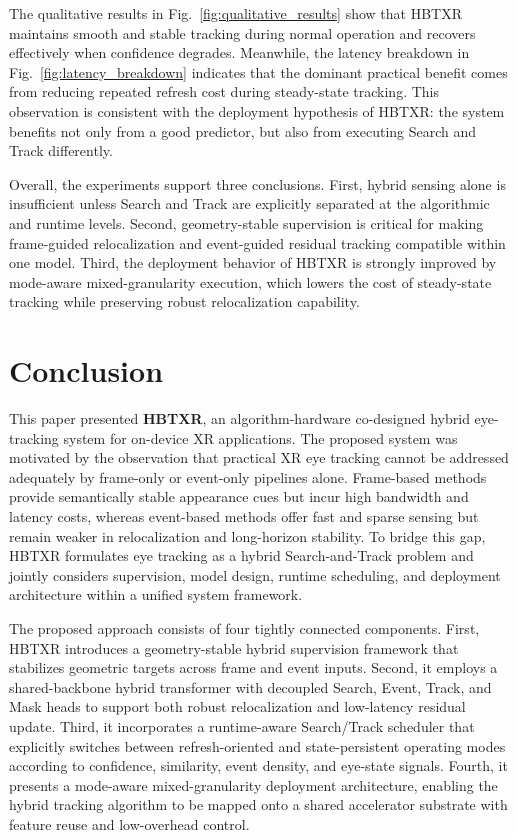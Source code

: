 ﻿\documentclass[journal]{IEEEtran}
\begin{document}
The qualitative results in Fig.~\ref{fig:qualitative_results} show that HBTXR maintains smooth and stable tracking during normal operation and recovers effectively when confidence degrades. Meanwhile, the latency breakdown in Fig.~\ref{fig:latency_breakdown} indicates that the dominant practical benefit comes from reducing repeated refresh cost during steady-state tracking. This observation is consistent with the deployment hypothesis of HBTXR: the system benefits not only from a good predictor, but also from executing Search and Track differently.

Overall, the experiments support three conclusions. First, hybrid sensing alone is insufficient unless Search and Track are explicitly separated at the algorithmic and runtime levels. Second, geometry-stable supervision is critical for making frame-guided relocalization and event-guided residual tracking compatible within one model. Third, the deployment behavior of HBTXR is strongly improved by mode-aware mixed-granularity execution, which lowers the cost of steady-state tracking while preserving robust relocalization capability.

\section{Conclusion}

This paper presented \textbf{HBTXR}, an algorithm-hardware co-designed hybrid eye-tracking system for on-device XR applications. The proposed system was motivated by the observation that practical XR eye tracking cannot be addressed adequately by frame-only or event-only pipelines alone. Frame-based methods provide semantically stable appearance cues but incur high bandwidth and latency costs, whereas event-based methods offer fast and sparse sensing but remain weaker in relocalization and long-horizon stability. To bridge this gap, HBTXR formulates eye tracking as a hybrid Search-and-Track problem and jointly considers supervision, model design, runtime scheduling, and deployment architecture within a unified system framework.

The proposed approach consists of four tightly connected components. First, HBTXR introduces a geometry-stable hybrid supervision framework that stabilizes geometric targets across frame and event inputs. Second, it employs a shared-backbone hybrid transformer with decoupled Search, Event, Track, and Mask heads to support both robust relocalization and low-latency residual update. Third, it incorporates a runtime-aware Search/Track scheduler that explicitly switches between refresh-oriented and state-persistent operating modes according to confidence, similarity, event density, and eye-state signals. Fourth, it presents a mode-aware mixed-granularity deployment architecture, enabling the hybrid tracking algorithm to be mapped onto a shared accelerator substrate with feature reuse and low-overhead control.
\end{document}
